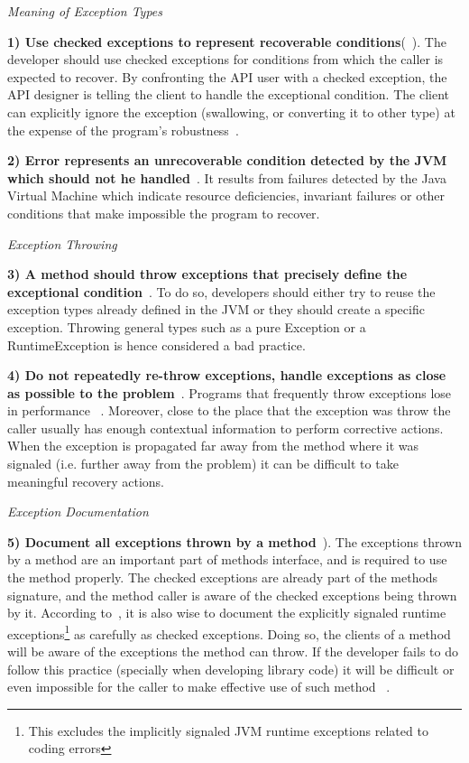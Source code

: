 \documentclass[conference]{IEEEtran}
\begin{document}
\noindent\emph{Meaning of Exception Types}

\textbf{1) Use checked exceptions to represent recoverable
conditions}(~\cite{mandrioli1992advances,gosling2000java,wirfs2006toward,bloch2008effective}).
The developer should use checked exceptions for conditions from which the caller
is expected to recover. By confronting the API user with a checked exception,
the API designer is telling the client to handle the exceptional condition. The
client can explicitly ignore the exception (swallowing, or converting it to
other type) at the expense of the program's robustness~\cite{gosling2000java}.

\textbf{2) Error represents an unrecoverable condition detected by the JVM which
should not he handled}~\cite{gosling2000java}. It results from failures detected
by the Java Virtual Machine which indicate resource deficiencies, invariant
failures or other conditions that make impossible the program to recover.

\noindent\emph{Exception Throwing}

\textbf{3) A method should throw exceptions that precisely define the
exceptional condition}~\cite{gosling2000java,bloch2008effective}. To do so,
developers should either try to reuse the exception types already defined in the
JVM or they should create a specific exception. Throwing general types such as a
pure Exception or a RuntimeException is hence considered a bad practice.

\textbf{4) Do not repeatedly re-throw exceptions, handle exceptions as close as
possible to the problem}~\cite{wirfs2006toward}. Programs that frequently throw
exceptions lose in performance ~\cite{wirfs2006toward,gosling2000java}.
Moreover, close to the place that the exception was throw the caller usually has
enough contextual information to perform  corrective actions. When the exception
is propagated far away from the method where it was signaled (i.e. further away
from the problem) it can be difficult to take meaningful recovery actions.

\noindent\emph{Exception Documentation}

\textbf{5) Document all exceptions thrown by a
method}~\cite{mandrioli1992advances,gosling2000java,wirfs2006toward,bloch2008effective}).
The exceptions thrown by a method are an important part of methods interface,
and is required to use the method properly. The checked exceptions are already
part of the  methods signature, and the method caller is aware of the checked
exceptions being thrown by it. According to~\cite{bloch2008effective}, it is
also wise to document the explicitly signaled runtime exceptions\footnote{This
excludes the implicitly signaled JVM runtime exceptions related to coding
errors} as carefully as checked exceptions. Doing so, the clients of a method
will be aware of the exceptions the method can throw. If the developer fails to
do follow this practice (specially when developing library code) it will be
difficult or even impossible for the caller to make effective use of such method
~\cite{wirfs2006toward, bloch2008effective}.
\end{document}
